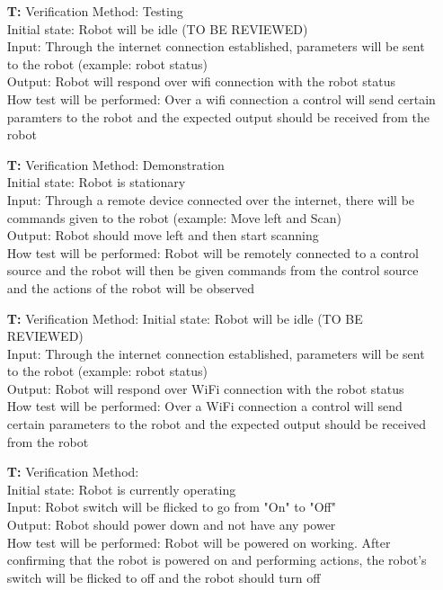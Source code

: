\documentclass[12pt, titlepage]{article}
\newcounter{tnum} %
\begin{document}
\begin{itemize}
\item[\textbf{T\refstepcounter{tnum}\thetnum:}]
Verification Method: Testing	\\
Initial state: Robot will be idle (TO BE REVIEWED) \\
Input: Through the internet connection established, parameters will be sent to the robot (example: robot status) \\
Output: Robot will respond over wifi connection with the robot status  \\
How test will be performed: Over a wifi connection a control will send certain paramters to the robot and the expected output should be received from the robot \\

\item[\textbf{T\refstepcounter{tnum}\thetnum:}]
Verification Method: Demonstration\\
Initial state: Robot is stationary \\
Input: Through a remote device connected over the internet, there will be commands given to the robot (example: Move left and Scan) \\
Output: Robot should move left and then start scanning  \\
How test will be performed: Robot will be remotely connected to a control source and the robot will then be given commands from the control source and the actions of the robot will be observed \\

\item[\textbf{T\refstepcounter{tnum}\thetnum:}]
Verification Method: 
Initial state: Robot will be idle (TO BE REVIEWED) \\
Input: Through the internet connection established, parameters will be sent to the robot (example: robot status) \\
Output: Robot will respond over WiFi connection with the robot status  \\
How test will be performed: Over a WiFi connection a control will send certain parameters to the robot and the expected output should be received from the robot \\

\item[\textbf{T\refstepcounter{tnum}\thetnum:}]
Verification Method: \\
Initial state: Robot is currently operating \\
Input: Robot switch will be flicked to go from "On" to "Off"\\
Output: Robot should power down and not have any power \\
How test will be performed: Robot will be powered on working. After confirming that the robot is powered on and performing actions, the robot's switch will be flicked to off and the robot should turn off \\


\end{itemize}
\end{document}
